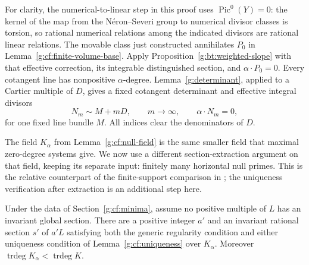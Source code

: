 For clarity, the numerical-to-linear step in this proof uses
$\operatorname{Pic}^0(Y)=0$: the kernel of the map from the N\'eron--Severi
group to numerical divisor classes is torsion, so rational numerical
relations among the indicated divisors are rational linear relations.
The movable class just constructed annihilates $P_0$ in
Lemma~\ref{g:cf:finite-volume-base}. Apply
Proposition~\ref{g:bt:weighted-slope} with that effective correction, its
integrable distinguished section, and $\alpha\cdot P_0=0$. Every
cotangent line has nonpositive $\alpha$-degree.
Lemma~\ref{g:determinant}, applied to a Cartier multiple of $D$,
gives a fixed cotangent determinant and effective integral divisors
\begin{equation}\label{g:cf:null-divisors}
 N_m\sim M+mD,\qquad m\longrightarrow\infty,\qquad
 \alpha\cdot N_m=0,
\end{equation}
for one fixed line bundle $M$. All indices clear the denominators of $D$.

The field $K_\alpha$ from Lemma~\ref{g:cf:null-field} is the same smaller
field that maximal zero-degree systems give. We now use a different
section-extraction argument on that field, keeping its separate input:
finitely many horizontal null primes. This is the relative counterpart
of the finite-support comparison in \cite[Lemma~2.1]{LP2018}; the
uniqueness verification after extraction is an additional step here.

\begin{proposition}\label{g:cf:dickson}
Under the data of Section~\ref{g:cf:minima}, assume no positive multiple of
$L$ has an invariant global section. There are a positive integer $a'$ and
an invariant rational section $s'$ of $a'L$ satisfying both the generic
regularity condition and either uniqueness condition of
Lemma~\ref{g:cf:uniqueness} over $K_\alpha$. Moreover
$\operatorname{trdeg}K_\alpha<\operatorname{trdeg}K$.
\end{proposition}

